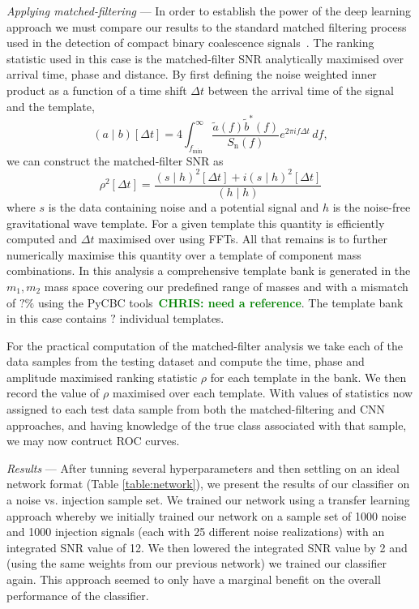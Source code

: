 \documentclass[%
 amsmath,amssymb,
 aps,
 twocolumn,
 prl,
 reprint,
floatfix,
]{revtex4-1}
\newcommand{\chris}[1]{\textbf{\textcolor{green}{CHRIS: #1}}}
\begin{document}
%
%
\textit{Applying matched-filtering} ---
%
%
In order to establish the power of the deep learning approach we must compare
our results to the standard matched filtering process used in the detection of
compact binary coalescence
signals~\cite{PhysRevD.85.122006,2013PhRvD..87b4033B}. The ranking statistic
used in this case is the matched-filter \ac{SNR} analytically maximised over
arrival time, phase and distance. By first defining the noise weighted inner
product as a function of a time shift $\Delta t$ between the arrival time of
the signal and the template,
%
%
\begin{equation}
(a\mid b)[\Delta t] =
4\int_{f_{\mathrm{min}}}^{\infty}\frac{\tilde{a}(f)\tilde{b}^{*}(f)}{S_{\mathrm{n}}(f)}e^{2\pi i
f\Delta t}\,df,
\end{equation}
%
we can construct the matched-filter \ac{SNR} as 
%
\begin{equation}
\rho^{2}[\Delta t]=\frac{(s\mid h)^{2}[\Delta t] + i(s\mid h)^{2}[\Delta t]}{(h\mid h)}
\end{equation}
%
where $s$ is the data containing noise and a potential signal and $h$ is the
noise-free gravitational wave template. For a given template this quantity is
efficiently computed and $\Delta t$ maximised over using \acp{FFT}.  All that
remains is to further numerically maximise this quantity over a template of
component mass combinations. In this analysis a comprehensive template bank is
generated in the $m_{1},m_{2}$ mass space covering our predefined range of
masses and with a mismatch of $?\%$ using the PyCBC tools~\chris{need a
reference}. The template bank in this case contains $?$ individual templates. 

%
%
For the practical computation of the matched-filter analysis we take each of
the data samples from the testing dataset and compute the time, phase and
amplitude maximised ranking statistic $\rho$ for each template in the bank. We
then record the value of $\rho$ maximised over each template. With values of
statistics now assigned to each test data sample from both the
matched-filtering and \ac{CNN} approaches, and having knowledge of the
true class associated with that sample, we may now contruct \ac{ROC} curves.  

\textit{Results} --- After tunning several hyperparameters and then settling on
an ideal network format (Table \ref{table:network}), we present the results of
our classifier on a noise vs. injection sample set. We trained our network
using a transfer learning approach whereby we initially trained our network on
a sample set of 1000 noise and 1000 injection signals (each with 25 different
noise realizations) with an integrated SNR value of 12. We then lowered the
integrated SNR value by 2 and (using the same weights from our previous
network) we trained our classifier again. This approach seemed to only have a
marginal benefit on the overall performance of the classifier.  
\end{document}
